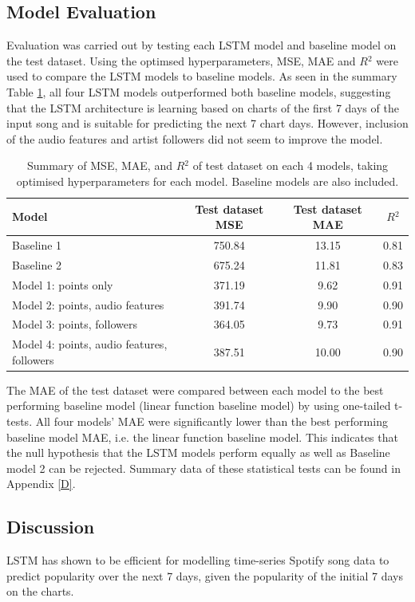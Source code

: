 \documentclass{article}
\begin{document}
\subsection{Model Evaluation}
Evaluation was carried out by testing each LSTM model and baseline model on the test dataset. Using the optimsed hyperparameters, MSE, MAE and $R{^2}$ were used to compare the LSTM models to baseline models. As seen in the summary Table \ref{tab:test}, all four LSTM models outperformed both baseline models, suggesting that the LSTM architecture is learning based on charts of the first 7 days of the input song and is suitable for predicting the next 7 chart days. However, inclusion of the audio features and artist followers did not seem to improve the model.

\begin{table}[h!]
  \centering
  \begin{tabular}{|p{6cm}|c|c|c|}
    \hline
    \textbf{Model} & \textbf{Test dataset MSE} & \textbf{Test dataset MAE} & \textbf{$R{^2}$}\\
    \hline
    Baseline 1 & 750.84 & 13.15 & 0.81 \\
    Baseline 2 & 675.24 & 11.81 & 0.83 \\
    Model 1: points only & 371.19 & 9.62 & 0.91 \\
    Model 2: points, audio features & 391.74 & 9.90 & 0.90 \\
    Model 3: points, followers & 364.05 & 9.73 & 0.91 \\
    Model 4: points, audio features, followers & 387.51 & 10.00 & 0.90 \\
    \hline
  \end{tabular}
  \caption{Summary of MSE, MAE, and $R{^2}$ of test dataset on each 4 models, taking optimised hyperparameters for each model. Baseline models are also included.}
  \label{tab:test}
\end{table}

The MAE of the test dataset were compared between each model to the best performing baseline model (linear function baseline model) by using one-tailed t-tests. All four models' MAE were significantly lower than the best performing baseline model MAE, i.e. the linear function baseline model. This indicates that the null hypothesis that the LSTM models perform equally as well as Baseline model 2 can be rejected. Summary data of these statistical tests can be found in Appendix \ref{D}.


\subsection{Discussion}
LSTM has shown to be efficient for modelling time-series Spotify song data to predict popularity over the next 7 days, given the popularity of the initial 7 days on the charts. 
\end{document}
